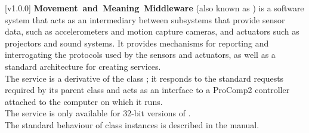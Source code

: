 [v1.0.0]
\textbf{Movement~and~Meaning~Middleware} (also known as \mplusm) is a software system
that acts as an intermediary between subsystems that provide sensor data, such as
accelerometers and motion capture cameras, and actuators such as projectors and sound
systems.
It provides mechanisms for reporting and interrogating the protocols used by the sensors
and actuators, as well as a standard architecture for creating services.\\

The \PCtwoI{} service is a derivative of the \mplusm{} class ;
it responds to the standard requests required by its parent class and acts as an interface
to a ProComp2 controller attached to the computer on which it runs.\\

The \PCtwoI{} service is only available for \win{} 32-bit versions of \mplusm.\\

The standard behaviour of  class instances is described in
the \emph{\MMM} manual.
\primaryEnd{}
